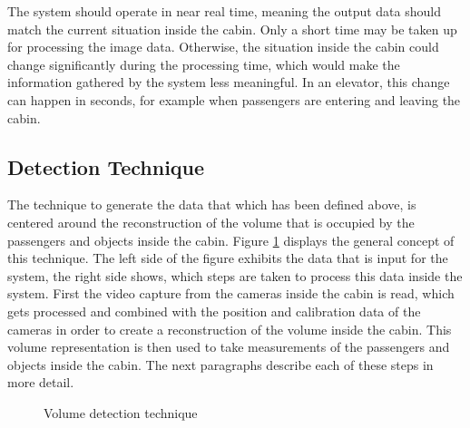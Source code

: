 The system should operate in near real time,
meaning the output data should match the current situation inside the cabin.
Only a short time may be taken up for processing the image data.
Otherwise, the situation inside the cabin could change significantly during the processing time, which would make the information gathered by the system less meaningful.
In an elevator, this change can happen in seconds, for example when passengers are entering and leaving the cabin.

\subsection{Detection Technique}

The technique to generate the data that which has been defined above,
is centered around the reconstruction of the volume that is occupied by the passengers and objects inside the cabin.
Figure \ref{fig:design:volumedetection} displays the general concept of this technique.
The left side of the figure exhibits the data that is input for the system, 
the right side shows, which steps are taken to process this data inside the system.
First the video capture from the cameras inside the cabin is read, which gets processed and combined with the position and calibration data of the cameras in order to create a reconstruction of the volume inside the cabin.
This volume representation is then used to take measurements of the passengers and objects inside the cabin.
The next paragraphs describe each of these steps in more detail.

\begin{figure}[hptb]
    \centering
    \caption{Volume detection technique}
    \label{fig:design:volumedetection}
\end{figure}

